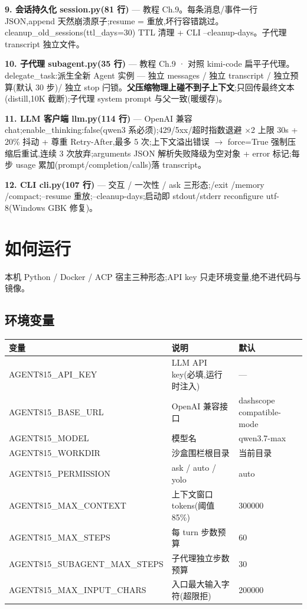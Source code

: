 \documentclass[10pt,a4paper]{article}
\renewcommand{\small}{\fontsize{8}{11.5}\selectfont}
\renewcommand{\footnotesize}{\fontsize{7.5}{10.5}\selectfont}
\newcommand{\lv}[2]{\textcolor{#1}{\textbf{\footnotesize[#2]}}}
\begin{document}
\textbf{9. 会话持久化 session.py(81 行)\lv{okc}{L2}} --- 教程 Ch.9。每条消息/事件一行 JSON,append 天然崩溃原子;resume = 重放,坏行容错跳过。cleanup\_old\_sessions(ttl\_days=30) TTL 清理 + CLI --cleanup-days。子代理 transcript 独立文件。

\textbf{10. 子代理 subagent.py(35 行)\lv{acc}{L1}} --- 教程 Ch.9 · 对照 kimi-code 扁平子代理。delegate\_task:派生全新 Agent 实例 --- 独立 messages / 独立 transcript / 独立预算(默认 30 步)/ 独立 stop 闩锁。\textbf{父压缩物理上碰不到子上下文};只回传最终文本(distill,10K 截断);子代理 system prompt 与父一致(暖缓存)。

\textbf{11. LLM 客户端 llm.py(114 行)\lv{okc}{L2}} --- OpenAI 兼容 chat;enable\_thinking:false(qwen3 系必须);429/5xx/超时指数退避 $\times$2 上限 30s + 20\% 抖动 + 尊重 Retry-After,最多 5 次;上下文溢出错误 $\to$ force=True 强制压缩后重试,连续 3 次放弃;arguments JSON 解析失败降级为空对象 + error 标记;每步 usage 累加(prompt/completion/calls)落 transcript。

\textbf{12. CLI cli.py(107 行)\lv{acc}{L1}} --- 交互 / 一次性 / ask 三形态;/exit /memory /compact;--resume 重放;--cleanup-days;启动即 stdout/stderr reconfigure utf-8(Windows GBK 修复)。

\section{如何运行}

本机 Python / Docker / ACP 宿主三种形态;API key 只走环境变量,绝不进代码与镜像。

\subsection{环境变量}
{\small
\begin{longtable}{L{0.30\textwidth}L{0.44\textwidth}L{0.20\textwidth}}
\hline
{}\textbf{变量} & \textbf{说明} & \textbf{默认}\\\hline\endhead
AGENT815\_API\_KEY & LLM API key(必填,运行时注入) & ---\\\hline
AGENT815\_BASE\_URL & OpenAI 兼容接口 & dashscope compatible-mode\\\hline
AGENT815\_MODEL & 模型名 & qwen3.7-max\\\hline
AGENT815\_WORKDIR & 沙盒围栏根目录 & 当前目录\\\hline
AGENT815\_PERMISSION & ask / auto / yolo & auto\\\hline
AGENT815\_MAX\_CONTEXT & 上下文窗口 tokens(阈值 85\%) & 300000\\\hline
AGENT815\_MAX\_STEPS & 每 turn 步数预算 & 60\\\hline
AGENT815\_SUBAGENT\_MAX\_STEPS & 子代理独立步数预算 & 30\\\hline
AGENT815\_MAX\_INPUT\_CHARS & 入口最大输入字符(超限拒) & 200000\\\hline
\end{longtable}}
\end{document}
